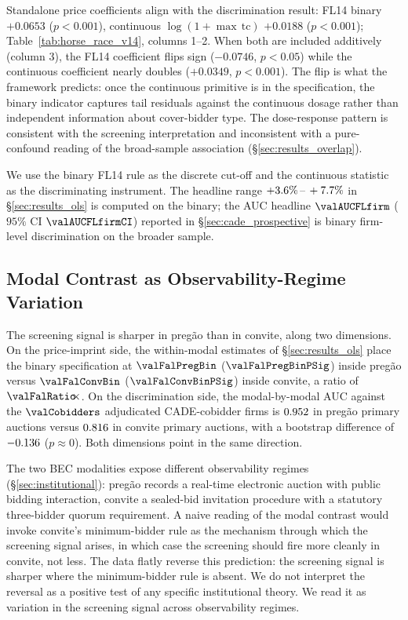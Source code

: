 Standalone price coefficients align with the discrimination
result: FL14 binary $+0.0653$ ($p<0.001$), continuous
$\log(1+\max\,\text{tc})$ $+0.0188$ ($p<0.001$);
Table~\ref{tab:horse_race_v14}, columns 1--2. When both are
included additively (column 3), the FL14 coefficient flips sign
($-0.0746$, $p<0.05$) while the continuous coefficient nearly
doubles ($+0.0349$, $p<0.001$). The flip is what the framework
predicts: once the continuous primitive is in the specification,
the binary indicator captures tail residuals against the
continuous dosage rather than independent information about
cover-bidder type. The dose-response pattern is consistent with
the screening interpretation and inconsistent with a
pure-confound reading of the broad-sample association
(\S\ref{sec:results_overlap}).

We use the binary FL14 rule as the discrete cut-off and the
continuous statistic as the discriminating instrument. The
headline range $+3.6\%\,\text{--}\,+7.7\%$ in
\S\ref{sec:results_ols} is computed on the binary; the AUC
headline $\valAUCFLfirm$ ($95\%$ CI $\valAUCFLfirmCI$) reported
in \S\ref{sec:cade_prospective} is binary firm-level
discrimination on the broader sample.

\subsection{Modal Contrast as Observability-Regime Variation}
\label{sec:mech_modal}

The screening signal is sharper in preg\~ao than in convite,
along two dimensions. On the price-imprint side, the within-modal
estimates of \S\ref{sec:results_ols} place the binary
specification at $\valFalPregBin$ ($\valFalPregBinPSig$) inside
preg\~ao versus $\valFalConvBin$ ($\valFalConvBinPSig$) inside
convite, a ratio of $\valFalRatio\!\!\times$. On the
discrimination side, the modal-by-modal AUC against the
$\valCobidders$ adjudicated CADE-cobidder firms is
$0.952$ in preg\~ao primary auctions versus
$0.816$ in convite primary auctions, with a bootstrap
difference of $-0.136$ ($p\approx 0$). Both dimensions
point in the same direction.

The two BEC modalities expose different observability regimes
(\S\ref{sec:institutional}): preg\~ao records a real-time
electronic auction with public bidding interaction, convite a
sealed-bid invitation procedure with a statutory three-bidder
quorum requirement. A naive reading of the modal contrast would
invoke convite's minimum-bidder rule as the mechanism through
which the screening signal arises, in which case the screening
should fire more cleanly in convite, not less. The data
flatly reverse this prediction: the screening signal is sharper
where the minimum-bidder rule is absent. We do not interpret
the reversal as a positive test of any specific institutional
theory. We read it as variation in the screening signal across
observability regimes.

